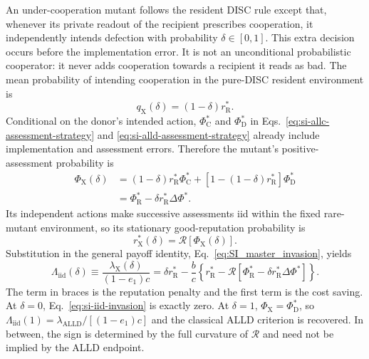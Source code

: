 \documentclass[fleqn,10pt]{wlscirep}
\begin{document}
An under-cooperation mutant follows the resident DISC rule except that, whenever its private readout of the recipient prescribes cooperation, it independently intends defection with probability $\delta\in[0,1]$. This extra decision occurs before the implementation error. It is not an unconditional probabilistic cooperator: it never adds cooperation towards a recipient it reads as bad. The mean probability of intending cooperation in the pure-DISC resident environment is
\begin{equation}
q_{\mathrm X}(\delta)=(1-\delta)r_{\mathrm R}^*.
\label{eq:si-iid-intended-cooperation}
\end{equation}
Conditional on the donor's intended action, $\Phi_{\mathrm C}^*$ and $\Phi_{\mathrm D}^*$ in Eqs.~\eqref{eq:si-allc-assessment-strategy} and \eqref{eq:si-alld-assessment-strategy} already include implementation and assessment errors. Therefore the mutant's positive-assessment probability is
\begin{align}
\Phi_{\mathrm X}(\delta)
&=(1-\delta)r_{\mathrm R}^*\Phi_{\mathrm C}^*
 +[1-(1-\delta)r_{\mathrm R}^*]\Phi_{\mathrm D}^*\\
&=\Phi_{\mathrm R}^*-\delta r_{\mathrm R}^*\Delta\Phi^*.
\label{eq:si-iid-assessment}
\end{align}
Its independent actions make successive assessments iid within the fixed rare-mutant environment, so its stationary good-reputation probability is
\begin{equation}
r_{\mathrm X}^*(\delta)=\mathcal R[\Phi_{\mathrm X}(\delta)].
\label{eq:si-iid-reputation}
\end{equation}
Substitution in the general payoff identity, Eq.~\eqref{eq:SI_master_invasion}, yields
\begin{equation}
\Lambda_{\mathrm{iid}}(\delta)
\equiv\frac{\lambda_{\mathrm X}(\delta)}{(1-e_1)c}
=\delta r_{\mathrm R}^*-\frac bc
\left\{r_{\mathrm R}^*-\mathcal R[\Phi_{\mathrm R}^*-\delta r_{\mathrm R}^*\Delta\Phi^*]\right\}.
\label{eq:si-iid-invasion}
\end{equation}
The term in braces is the reputation penalty and the first term is the cost saving. At $\delta=0$, Eq.~\eqref{eq:si-iid-invasion} is exactly zero. At $\delta=1$, $\Phi_{\mathrm X}=\Phi_{\mathrm D}^*$, so $\Lambda_{\mathrm{iid}}(1)=\lambda_{\mathrm{ALLD}}/[(1-e_1)c]$ and the classical ALLD criterion is recovered. In between, the sign is determined by the full curvature of $\mathcal R$ and need not be implied by the ALLD endpoint.
\end{document}
